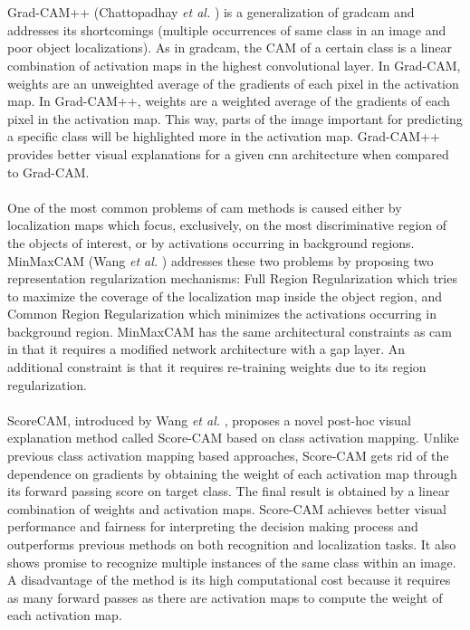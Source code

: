 \\\\
Grad-CAM++ (Chattopadhay \textit{et al.} \cite{chattopadhay2018grad}) is a generalization of \acrshort{gradcam} and addresses its shortcomings (multiple occurrences of same class in an image and poor object localizations). As in \acrshort{gradcam}, the CAM of a certain class is a linear combination of activation maps in the highest convolutional layer. In Grad-CAM, weights are an unweighted average of the gradients of each pixel in the activation map. In Grad-CAM++, weights are a weighted average of the gradients of each pixel in the activation map. This way, parts of the image important for predicting a specific class will be highlighted more in the activation map. Grad-CAM++ provides better visual explanations for a given \acrshort{cnn} architecture when compared to Grad-CAM.
\\\\
One of the most common problems of \acrshort{cam} methods is caused either by localization maps which focus, exclusively, on the most discriminative region of the objects of interest, or by activations occurring in background regions. MinMaxCAM (Wang \textit{et al.} \cite{wang2021minmaxcam}) addresses these two problems by proposing two representation regularization mechanisms: Full Region Regularization which tries to maximize the coverage of the localization map inside the object region, and Common Region Regularization which minimizes the activations occurring in background region. MinMaxCAM has the same architectural constraints as \acrshort{cam} in that it requires a modified network architecture with a \acrshort{gap} layer. An additional constraint is that it requires re-training weights due to its region regularization.
\\\\
ScoreCAM, introduced by Wang \textit{et al.} \cite{wang2020score}, proposes a novel post-hoc visual explanation method called Score-CAM based on class activation mapping. Unlike previous class activation mapping based approaches, Score-CAM gets rid of the dependence on gradients by obtaining the weight of each activation map through its forward passing score on target class. The final result is obtained by a linear combination of weights and activation maps. Score-CAM achieves better visual performance and fairness for interpreting the decision making process and outperforms previous methods on both recognition and localization tasks. It also shows promise to recognize multiple instances of the same class within an image. A disadvantage of the method is its high computational cost because it requires as many forward passes as there are activation maps to compute the weight of each activation map.
